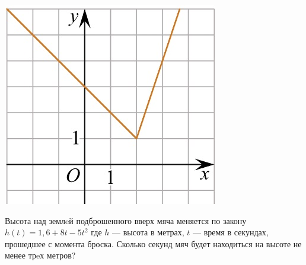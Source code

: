 \begin{class}[number=5]
\begin{listofex}
\begin{minipage}[t]{\bodywidth}
		\end{minipage}
		\hspace{0.05\linewidth}
		\begin{minipage}[t]{\picwidth}
			\includegraphics[align=t, width=\linewidth]{pics/G101M4C5-7.jpg}
		\end{minipage}
		\item Высота над землeй подброшенного вверх мяча меняется по закону \(h(t)=1,6+8t-5t^2\) где \(h\) --- высота в метрах, \(t\) --- время в секундах, прошедшее с момента броска. Сколько секунд мяч будет
		находиться на высоте не менее трeх метров?
	\end{listofex}
\end{class}
%
%
%
%	
%
%
